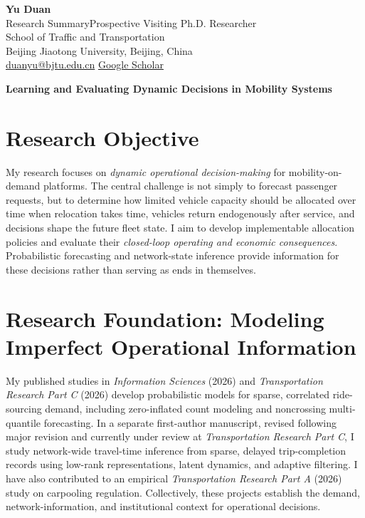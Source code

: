 \documentclass[11pt]{article}
\begin{document}
\begin{center}
 \Large\textbf{Yu Duan}\normalsize\\[4pt]
 Research Summary\quad\textbar\quad Prospective Visiting Ph.D. Researcher\\[3pt]
 School of Traffic and Transportation\\
 Beijing Jiaotong University, Beijing, China\\[3pt]
 \href{mailto:duanyu@bjtu.edu.cn}{duanyu@bjtu.edu.cn}\quad\textbar\quad
 \href{https://scholar.google.com/citations?user=pLcJk40AAAAJ}{Google Scholar}
\end{center}
\RaggedRight
\begin{center}
 \large\textbf{Learning and Evaluating Dynamic Decisions in Mobility Systems}
\end{center}
\section*{Research Objective}
My research focuses on \emph{dynamic operational decision-making} for mobility-on-demand platforms. The central challenge is not simply to forecast passenger requests, but to determine how limited vehicle capacity should be allocated over time when relocation takes time, vehicles return endogenously after service, and decisions shape the future fleet state. I aim to develop implementable allocation policies and evaluate their \emph{closed-loop operating and economic consequences}. Probabilistic forecasting and network-state inference provide information for these decisions rather than serving as ends in themselves.

\section*{Research Foundation: Modeling Imperfect Operational Information}
My published studies in \emph{Information Sciences} (2026) and \emph{Transportation Research Part C} (2026) develop probabilistic models for sparse, correlated ride-sourcing demand, including zero-inflated count modeling and noncrossing multi-quantile forecasting. In a separate first-author manuscript, revised following major revision and currently under review at \emph{Transportation Research Part C}, I study network-wide travel-time inference from sparse, delayed trip-completion records using low-rank representations, latent dynamics, and adaptive filtering. I have also contributed to an empirical \emph{Transportation Research Part A} (2026) study on carpooling regulation. Collectively, these projects establish the demand, network-information, and institutional context for operational decisions.
\end{document}
